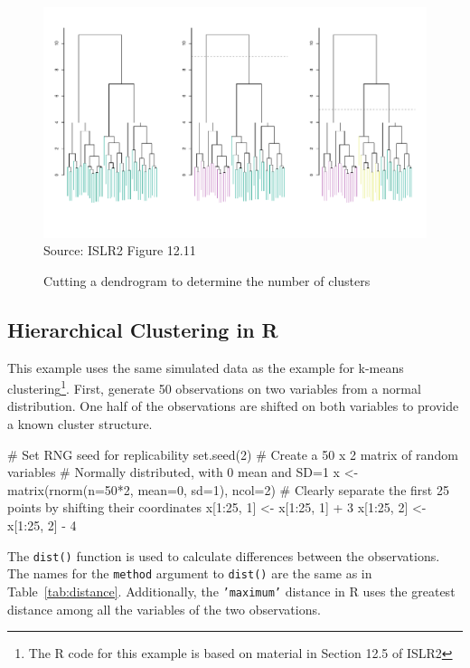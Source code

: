\begin{figure}
\centering
\includegraphics[width=\textwidth]{../class11/Figures_Chapters_7-13/Chapter12/12_11.pdf} \\

\scriptsize Source: ISLR2 Figure 12.11
\caption{Cutting a dendrogram to determine the number of clusters}
\label{fig:dendro3}
\end{figure}


\subsection{Hierarchical Clustering in R}

This example uses the same simulated data as the example for k-means clustering\footnote{The R code for this example is based on material in Section 12.5 of ISLR2}. First, generate 50 observations on two variables from a normal distribution. One half of the observations are shifted on both variables to provide a known cluster structure.

\begin{samepage}
\begin{Rcode}
# Set RNG seed for replicability
set.seed(2)
# Create a 50 x 2 matrix of random variables 
# Normally distributed, with 0 mean and SD=1
x <- matrix(rnorm(n=50*2, mean=0, sd=1), ncol=2)
# Clearly separate the first 25 points by shifting their coordinates
x[1:25, 1] <- x[1:25, 1] + 3
x[1:25, 2] <- x[1:25, 2] - 4
\end{Rcode}
\end{samepage}

The \texttt{dist()} function is used to calculate differences between the observations. The names for the \texttt{method} argument to \texttt{dist()} are the same as in Table~\ref{tab:distance}. Additionally, the \texttt{'maximum'} distance in R uses the greatest distance among all the variables of the two observations. 

